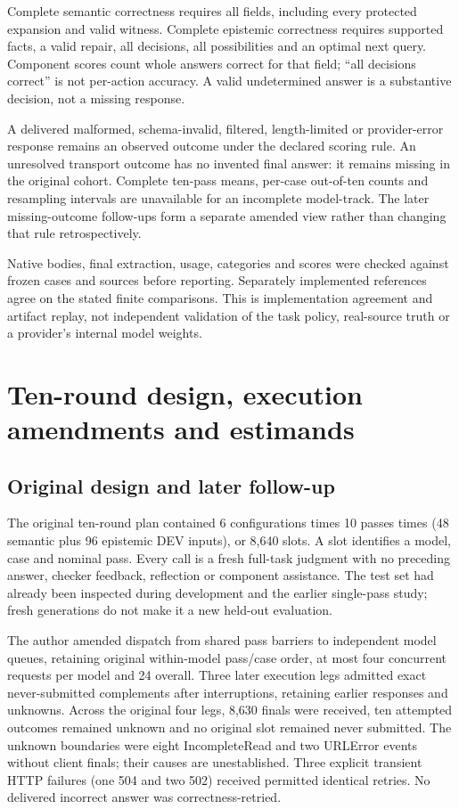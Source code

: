 \documentclass[a4paper,preprint,12pt,numbers,nopreprintline]{elsarticle}
\begin{document}
Complete semantic correctness requires all fields, including every protected expansion and valid witness. Complete epistemic correctness requires supported facts, a valid repair, all decisions, all possibilities and an optimal next query. Component scores count whole answers correct for that field; ``all decisions correct'' is not per-action accuracy. A valid undetermined answer is a substantive decision, not a missing response.

A delivered malformed, schema-invalid, filtered, length-limited or provider-error response remains an observed outcome under the declared scoring rule. An unresolved transport outcome has no invented final answer: it remains missing in the original cohort. Complete ten-pass means, per-case out-of-ten counts and resampling intervals are unavailable for an incomplete model-track. The later missing-outcome follow-ups form a separate amended view rather than changing that rule retrospectively.

Native bodies, final extraction, usage, categories and scores were checked against frozen cases and sources before reporting. Separately implemented references agree on the stated finite comparisons. This is implementation agreement and artifact replay, not independent validation of the task policy, real-source truth or a provider's internal model weights.

\section{Ten-round design, execution amendments and estimands}\label{sec:replication}
\subsection{Original design and later follow-up}
The original ten-round plan contained 6 configurations times 10 passes times (48 semantic plus 96 epistemic DEV inputs), or 8,640 slots. A slot identifies a model, case and nominal pass. Every call is a fresh full-task judgment with no preceding answer, checker feedback, reflection or component assistance. The test set had already been inspected during development and the earlier single-pass study; fresh generations do not make it a new held-out evaluation.

The author amended dispatch from shared pass barriers to independent model queues, retaining original within-model pass/case order, at most four concurrent requests per model and 24 overall. Three later execution legs admitted exact never-submitted complements after interruptions, retaining earlier responses and unknowns. Across the original four legs, 8,630 finals were received, ten attempted outcomes remained unknown and no original slot remained never submitted. The unknown boundaries were eight IncompleteRead and two URLError events without client finals; their causes are unestablished. Three explicit transient HTTP failures (one 504 and two 502) received permitted identical retries. No delivered incorrect answer was correctness-retried.
\end{document}
